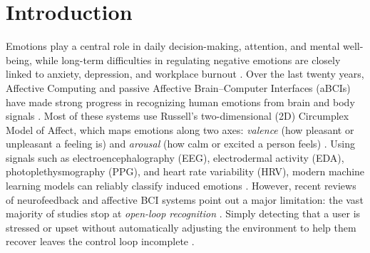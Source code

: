 \documentclass[preprint,12pt]{elsarticle}
\begin{document}
\section{Introduction}

Emotions play a central role in daily decision-making, attention, and mental well-being, while long-term difficulties in regulating negative emotions are closely linked to anxiety, depression, and workplace burnout \cite{russell1980circumplex,gross1995emotion,palfi2024adaptive}. Over the last twenty years, Affective Computing and passive Affective Brain--Computer Interfaces (aBCIs) have made strong progress in recognizing human emotions from brain and body signals \cite{wu2023affective,xiong2025affective}. Most of these systems use Russell's two-dimensional (2D) Circumplex Model of Affect, which maps emotions along two axes: \emph{valence} (how pleasant or unpleasant a feeling is) and \emph{arousal} (how calm or excited a person feels) \cite{russell1980circumplex}. Using signals such as electroencephalography (EEG), electrodermal activity (EDA), photoplethysmography (PPG), and heart rate variability (HRV), modern machine learning models can reliably classify induced emotions \cite{wu2023affective,koelstra2012deap,saganowski2022emognition}. However, recent reviews of neurofeedback and affective BCI systems point out a major limitation: the vast majority of studies stop at \emph{open-loop recognition} \cite{zhang2026closed,sayal2025music}. Simply detecting that a user is stressed or upset without automatically adjusting the environment to help them recover leaves the control loop incomplete \cite{ewing2016evaluation,lorenz2016automatic}.
\end{document}
